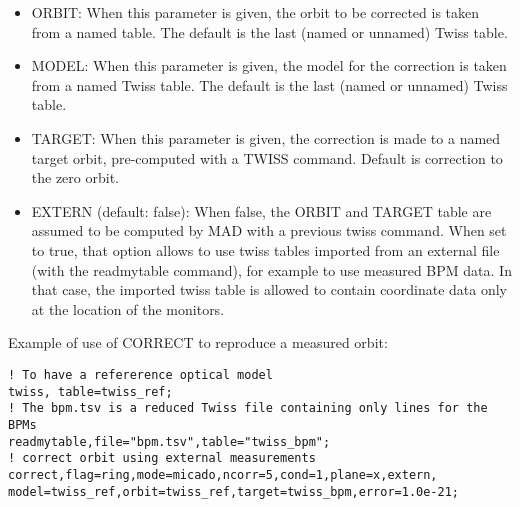 \begin{itemize}
   \item ORBIT: When this parameter is given, the orbit to be corrected
     is taken from a named table. The default is the last (named or
     unnamed) Twiss table.  

   \item MODEL: When this parameter is given, the model for the
     correction is taken from a named Twiss table. The default is the
     last (named or unnamed) Twiss table.  

   \item TARGET: When this parameter is given, the correction is made to
     a named target orbit, pre-computed with a TWISS command. Default is
     correction to the zero orbit.  

   \item EXTERN (default: false): When false, the ORBIT and TARGET table
     are assumed to be computed by MAD with a previous twiss
     command. When set to true, that option allows to use twiss tables
     imported from an external file (with the readmytable command), for
     example to use measured BPM data. In that case, the imported twiss
     table is allowed to contain coordinate data only at the location of
     the monitors.  
\end{itemize}

Example of use of CORRECT to reproduce a measured orbit: 
\begin{verbatim}
! To have a refererence optical model
twiss, table=twiss_ref;
! The bpm.tsv is a reduced Twiss file containing only lines for the BPMs
readmytable,file="bpm.tsv",table="twiss_bpm";
! correct orbit using external measurements
correct,flag=ring,mode=micado,ncorr=5,cond=1,plane=x,extern,
model=twiss_ref,orbit=twiss_ref,target=twiss_bpm,error=1.0e-21;
\end{verbatim}


